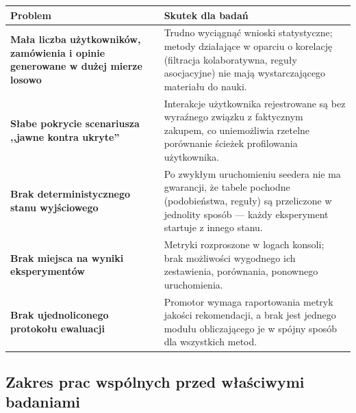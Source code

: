 \documentclass[12pt,a4paper]{article}
\begin{document}
\begin{tabularx}{\linewidth}{|>{\bfseries\color{primary}}p{4.5cm}|X|}
\hline
\rowcolor{lightbg}
\textbf{\color{primary}Problem} & \textbf{\color{primary}Skutek dla badań} \\ \hline
Mała liczba użytkowników, zamówienia i opinie generowane w dużej mierze losowo &
Trudno wyciągnąć wnioski statystyczne; metody działające w oparciu o korelację (filtracja kolaboratywna, reguły asocjacyjne) nie mają wystarczającego materiału do nauki. \\ \hline
Słabe pokrycie scenariusza ,,jawne kontra ukryte'' &
Interakcje użytkownika rejestrowane są bez wyraźnego związku z faktycznym zakupem, co uniemożliwia rzetelne porównanie ścieżek profilowania użytkownika. \\ \hline
Brak deterministycznego stanu wyjściowego &
Po zwykłym uruchomieniu seedera nie ma gwarancji, że tabele pochodne (podobieństwa, reguły) są przeliczone w jednolity sposób --- każdy eksperyment startuje z innego stanu. \\ \hline
Brak miejsca na wyniki eksperymentów &
Metryki rozproszone w logach konsoli; brak możliwości wygodnego ich zestawienia, porównania, ponownego uruchomienia. \\ \hline
Brak ujednoliconego protokołu ewaluacji &
Promotor wymaga raportowania metryk jakości rekomendacji, a brak jest jednego modułu obliczającego je w spójny sposób dla wszystkich metod. \\ \hline
\end{tabularx}

\subsection*{Zakres prac wspólnych przed właściwymi badaniami}
\end{document}
